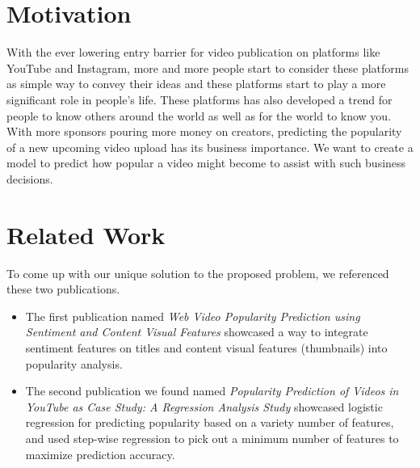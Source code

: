 \documentclass[english]{article}
\begin{document}

\section{Motivation}

With the ever lowering entry barrier for video publication on platforms like YouTube and Instagram, more and more people start to consider these platforms as simple way to convey their ideas and these platforms start to play a more significant role in people's life. These platforms has also developed a trend for people to know others around the world as well as for the world to know you. With more sponsors pouring more money on creators, predicting the popularity of a new upcoming video upload has its business importance. We want to create a model to predict how popular a video might become to assist with such business decisions.

\section{Related Work}
To come up with our unique solution to the proposed problem, we referenced these two publications. 
\begin{itemize}
    \item The first publication named \textit{Web Video Popularity Prediction using Sentiment and Content Visual Features} \cite{vp1} showcased a way to integrate sentiment features on titles and content visual features (thumbnails) into popularity analysis.
    \item The second publication we found named \textit{Popularity Prediction of Videos in YouTube as Case Study: A Regression Analysis Study} \cite{vp2} showcased logistic regression for predicting popularity based on a variety number of features, and used step-wise regression to pick out a minimum number of features to maximize prediction accuracy.
\end{itemize}
\end{document}

